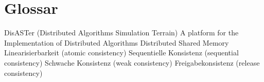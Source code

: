 \chapter{Glossar}

{}		{DisASTer (Distributed Algorithms Simulation Terrain) A platform for the Implementation of Distributed Algorithms}
		{		Distributed Shared Memory}
		{		Linearisierbarkeit (atomic consistency)}
		{		Sequentielle Konsistenz (sequential consistency)}
		{		Schwache Konsistenz (weak consistency)}
		{		Freigabekonsistenz (release consistency)}
